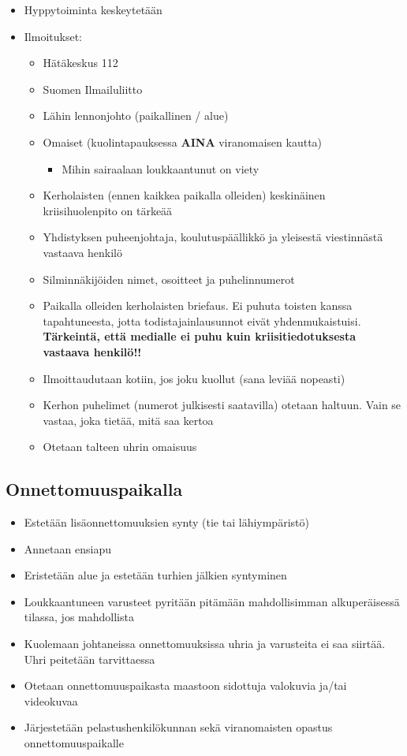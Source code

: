 \begin{itemize}
\item  Hyppytoiminta keskeytetään 
\item  Ilmoitukset: 
	\begin{itemize}
	\item  Hätäkeskus 112 
	\item  Suomen Ilmailuliitto 
	\item  Lähin lennonjohto (paikallinen / alue) 
	\item  Omaiset (kuolintapauksessa \textbf{AINA} viranomaisen kautta) 
		\begin{itemize}
		\item  Mihin sairaalaan loukkaantunut on viety 
		\end{itemize}
	\item  Kerholaisten (ennen kaikkea paikalla olleiden) keskinäinen kriisihuolenpito on tärkeää 
	\item  Yhdistyksen puheenjohtaja, koulutuspäällikkö ja yleisestä viestinnästä vastaava henkilö 
	\item  Silminnäkijöiden nimet, osoitteet ja puhelinnumerot 
	\item  Paikalla olleiden kerholaisten briefaus. Ei puhuta toisten kanssa tapahtuneesta, jotta todistajainlausunnot eivät yhdenmukaistuisi. \textbf{Tärkeintä, että medialle ei puhu kuin kriisitiedotuksesta vastaava henkilö!!} 
	\item  Ilmoittaudutaan kotiin, jos joku kuollut (sana leviää nopeasti) 
	\item  Kerhon puhelimet (numerot julkisesti saatavilla) otetaan haltuun. Vain se vastaa, joka tietää, mitä saa kertoa 
	\item  Otetaan talteen uhrin omaisuus 
	\end{itemize}
\end{itemize}
\subsection{Onnettomuuspaikalla}
\label{riskitekijat-toiminta-onnettomuustilanteessa-ja-ensiapu-onnettomuuspaikalla}

\begin{itemize}
\item  Estetään lisäonnettomuuksien synty (tie tai lähiympäristö) 
\item  Annetaan ensiapu 
\item  Eristetään alue ja estetään turhien jälkien syntyminen 
\item  Loukkaantuneen varusteet pyritään pitämään mahdollisimman alkuperäisessä tilassa, jos mahdollista 
\item  Kuolemaan johtaneissa onnettomuuksissa uhria ja varusteita ei saa siirtää. Uhri peitetään tarvittaessa 
\item  Otetaan onnettomuuspaikasta maastoon sidottuja valokuvia ja/tai videokuvaa 
\item  Järjestetään pelastushenkilökunnan sekä viranomaisten opastus onnettomuuspaikalle 
\end{itemize}
